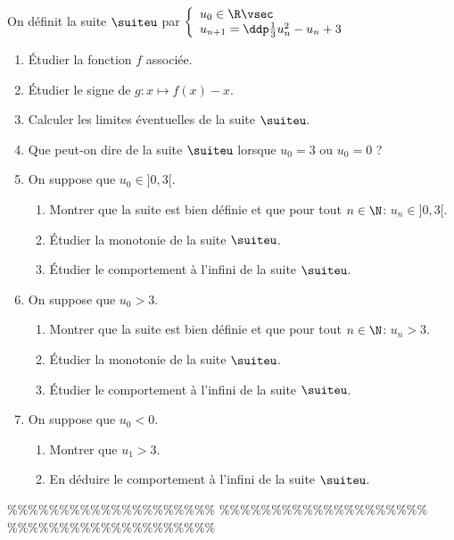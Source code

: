 



\begin{exercice} \;
On d\'efinit la suite $\suiteu$ par 
$\left\lbrace\begin{array}{l}
u_0\in\R\vsec\\
u_{n+1}=\ddp\frac{1}{3}u_n^2-u_n+3
\end{array}\right.$
\begin{enumerate}
\item \'Etudier la fonction $f$ associ\'ee.
\item \'Etudier le signe de $g: x\mapsto f(x)-x$.
\item Calculer les limites \'eventuelles de la suite $\suiteu$.
\item Que peut-on dire de la suite $\suiteu$ lorsque $u_0=3$ ou $u_0=0$ ?
\item On suppose que $u_0\in\rbrack 0,3\lbrack$.
\begin{enumerate}
\item Montrer que la suite est bien d\'efinie et que pour tout $n\in\N$: $u_n\in\rbrack 0,3\lbrack$.
\item \'Etudier la monotonie de la suite $\suiteu$.
\item \'Etudier le comportement \`{a} l'infini de la suite $\suiteu$.
\end{enumerate}
\item On suppose que $u_0>3$.
\begin{enumerate}
\item Montrer que la suite est bien d\'efinie et que pour tout $n\in\N$: $u_n>3$.
\item \'Etudier la monotonie de la suite $\suiteu$.
\item \'Etudier le comportement \`{a} l'infini de la suite $\suiteu$.
\end{enumerate} 
\item On suppose que $u_0<0$.
\begin{enumerate}
\item Montrer que $u_1>3$.
\item En d\'eduire le comportement \`{a} l'infini de la suite $\suiteu$.
\end{enumerate} 
\end{enumerate}
\end{exercice}


\%\%\%\%\%\%\%\%\%\%\%\%\%\%\%\%\%\%\%\%
\%\%\%\%\%\%\%\%\%\%\%\%\%\%\%\%\%\%\%\%
\%\%\%\%\%\%\%\%\%\%\%\%\%\%\%\%\%\%\%\%




